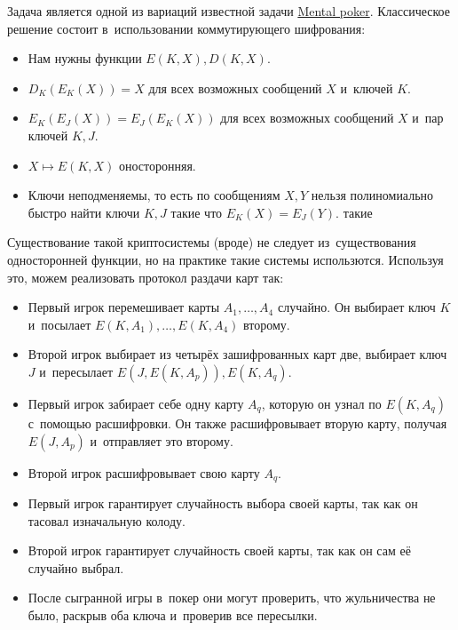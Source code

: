 \documentclass{article}
\begin{document}
Задача является одной из вариаций известной задачи
\href{https://en.wikipedia.org/wiki/Mental_poker}{Mental poker}. Классическое
решение состоит в~использовании коммутирующего шифрования:

\begin{itemize}
	\item Нам нужны функции $E(K, X), D(K, X)$.
	\item $D_K(E_K(X)) = X$ для всех возможных сообщений $X$ и~ключей $K$.
	\item $E_K(E_J(X)) = E_J(E_K(X))$ для всех возможных сообщений $X$ и~пар
		ключей $K, J$.
	\item $X \mapsto E(K,X)$ оносторонняя.
	\item Ключи неподменяемы, то есть по сообщениям $X, Y$ нельзя полиномиально
		быстро найти ключи $K, J$ такие что $E_K(X) = E_J(Y)$.
		такие
\end{itemize}

Существование такой криптосистемы (вроде) не следует из~существования
односторонней функции, но на практике такие системы использются. Используя это,
можем реализовать протокол раздачи карт так:

\begin{itemize}
	\item Первый игрок перемешивает карты $A_1, \ldots, A_4$ случайно. Он выбирает
		ключ $K$ и~посылает $E(K, A_1), \ldots, E(K, A_4)$ второму.
	\item Второй игрок выбирает из четырёх зашифрованных карт две, выбирает ключ
		$J$ и~пересылает $E(J, E(K, A_p)), E(K, A_q)$.
	\item Первый игрок забирает себе одну карту $A_q$, которую он узнал по $E(K,
		A_q)$ с~помощью расшифровки. Он также расшифровывает вторую карту, получая
		$E(J, A_p)$ и~отправляет это второму.
	\item Второй игрок расшифровывает свою карту $A_q$.
	\item Первый игрок гарантирует случайность выбора своей карты, так как он
		тасовал изначальную колоду.
	\item Второй игрок гарантирует случайность своей карты, так как он сам её
		случайно выбрал.
	\item После сыгранной игры в~покер они могут проверить, что жульничества не
		было, раскрыв оба ключа и~проверив все пересылки.
\end{itemize}
\end{document}
